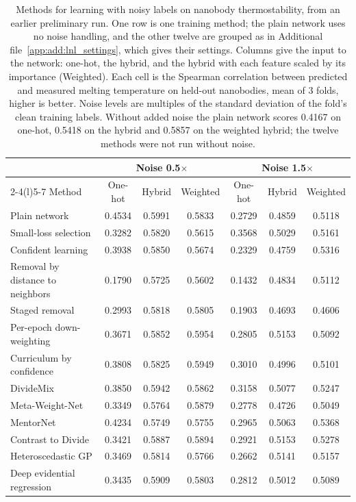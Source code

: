 \begin{table}[htbp]
\centering
\small
\begin{tabular}{@{}lcccccc@{}}
\toprule
 & \multicolumn{3}{c}{Noise 0.5$\times$} & \multicolumn{3}{c}{Noise 1.5$\times$} \\
\cmidrule(lr){2-4}\cmidrule(l){5-7}
Method & One-hot & Hybrid & Weighted & One-hot & Hybrid & Weighted \\
\midrule
Plain network & 0.4534 & 0.5991 & 0.5833 & 0.2729 & 0.4859 & 0.5118 \\
\midrule
Small-loss selection & 0.3282 & 0.5820 & 0.5615 & 0.3568 & 0.5029 & 0.5161 \\
Confident learning & 0.3938 & 0.5850 & 0.5674 & 0.2329 & 0.4759 & 0.5316 \\
Removal by distance to neighbors & 0.1790 & 0.5725 & 0.5602 & 0.1432 & 0.4834 & 0.5112 \\
Staged removal & 0.2993 & 0.5818 & 0.5805 & 0.1903 & 0.4693 & 0.4606 \\
\midrule
Per-epoch down-weighting & 0.3671 & 0.5852 & 0.5954 & 0.2805 & 0.5153 & 0.5092 \\
Curriculum by confidence & 0.3808 & 0.5825 & 0.5949 & 0.3010 & 0.4996 & 0.5101 \\
DivideMix & 0.3850 & 0.5942 & 0.5862 & 0.3158 & 0.5077 & 0.5247 \\
Meta-Weight-Net & 0.3349 & 0.5764 & 0.5879 & 0.2778 & 0.4726 & 0.5049 \\
MentorNet & 0.4234 & 0.5749 & 0.5755 & 0.2965 & 0.5063 & 0.5368 \\
Contrast to Divide & 0.3421 & 0.5887 & 0.5894 & 0.2921 & 0.5153 & 0.5278 \\
\midrule
Heteroscedastic GP & 0.3469 & 0.5814 & 0.5766 & 0.2662 & 0.5141 & 0.5157 \\
Deep evidential regression & 0.3435 & 0.5909 & 0.5803 & 0.2812 & 0.5012 & 0.5089 \\
\bottomrule
\end{tabular}
\caption[Methods for learning with noisy labels on nanobody thermostability (preliminary).]{Methods for learning with noisy labels on nanobody thermostability, from an earlier preliminary run. One row is one training method; the plain network uses no noise handling, and the other twelve are grouped as in Additional file~\ref{app:add:lnl_settings}, which gives their settings. Columns give the input to the network: one-hot, the hybrid, and the hybrid with each feature scaled by its importance (Weighted). Each cell is the Spearman correlation between predicted and measured melting temperature on held-out nanobodies, mean of 3 folds, higher is better. Noise levels are multiples of the standard deviation of the fold's clean training labels. Without added noise the plain network scores 0.4167 on one-hot, 0.5418 on the hybrid and 0.5857 on the weighted hybrid; the twelve methods were not run without noise.}
\label{tab:ch6prelim_lnl}
\end{table}

